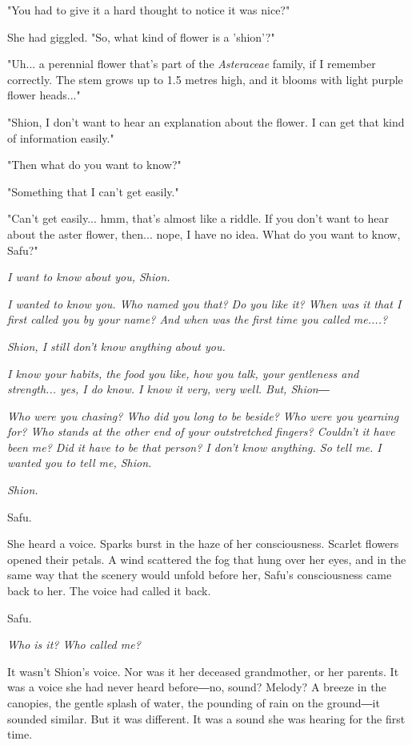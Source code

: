 "You had to give it a hard thought to notice it was nice?"

She had giggled. "So, what kind of flower is a 'shion'?"

"Uh... a perennial flower that's part of the \emph{Asteraceae} family, if I
remember correctly. The stem grows up to 1.5 metres high, and it blooms
with light purple flower heads..."

"Shion, I don't want to hear an explanation about the flower. I can get
that kind of information easily."

"Then what do you want to know?"

"Something that I can't get easily."

"Can't get easily... hmm, that's almost like a riddle. If you don't want
to hear about the aster flower, then... nope, I have no idea. What do
you want to know, Safu?"

\emph{I want to know about you, Shion.}

\emph{I wanted to know you. Who named you that? Do you like it? When was
it that I first called you by your name? And when was the first time you
called me....?}

\emph{Shion, I still don't know anything about you.}

\emph{I know your habits, the food you like, how you talk, your
gentleness and strength... yes, I do know. I know it very, very well.
But, Shion―}

\emph{Who were you chasing? Who did you long to be beside? Who were you
yearning for? Who stands at the other end of your outstretched fingers?
Couldn't it have been me? Did it have to be that person? I don't know
anything. So tell me. I wanted you to tell me, Shion.}

\emph{Shion.}

\myspace

Safu.

She heard a voice. Sparks burst in the haze of her consciousness.
Scarlet flowers opened their petals. A wind scattered the fog that hung
over her eyes, and in the same way that the scenery would unfold before
her, Safu's consciousness came back to her. The voice had called it
back.

Safu.

\emph{Who is it? Who called me?}

It wasn't Shion's voice. Nor was it her deceased grandmother, or her
parents. It was a voice she had never heard before―no, sound? Melody? A
breeze in the canopies, the gentle splash of water, the pounding of rain
on the ground―it sounded similar. But it was different. It was a sound
she was hearing for the first time.

